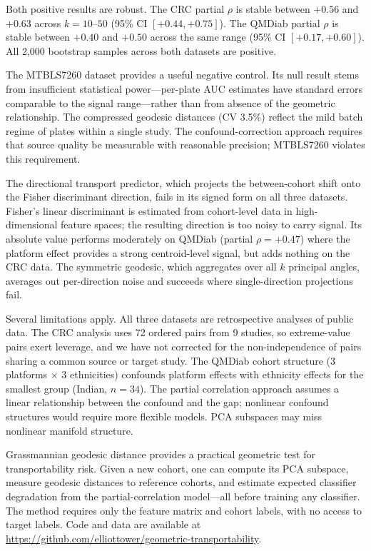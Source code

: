 \documentclass{article}
\begin{document}
Both positive results are robust. The CRC partial $\rho$ is stable between $+0.56$ and $+0.63$ across $k = 10$--$50$ (95\% CI $[+0.44, +0.75]$). The QMDiab partial $\rho$ is stable between $+0.40$ and $+0.50$ across the same range (95\% CI $[+0.17, +0.60]$). All 2{,}000 bootstrap samples across both datasets are positive.

The MTBLS7260 dataset provides a useful negative control. Its null result stems from insufficient statistical power---per-plate AUC estimates have standard errors comparable to the signal range---rather than from absence of the geometric relationship. The compressed geodesic distances (CV 3.5\%) reflect the mild batch regime of plates within a single study. The confound-correction approach requires that source quality be measurable with reasonable precision; MTBLS7260 violates this requirement.

The directional transport predictor, which projects the between-cohort shift onto the Fisher discriminant direction, fails in its signed form on all three datasets. Fisher's linear discriminant is estimated from cohort-level data in high-dimensional feature spaces; the resulting direction is too noisy to carry signal. Its absolute value performs moderately on QMDiab (partial $\rho = +0.47$) where the platform effect provides a strong centroid-level signal, but adds nothing on the CRC data. The symmetric geodesic, which aggregates over all $k$ principal angles, averages out per-direction noise and succeeds where single-direction projections fail.

Several limitations apply. All three datasets are retrospective analyses of public data. The CRC analysis uses 72 ordered pairs from 9 studies, so extreme-value pairs exert leverage, and we have not corrected for the non-independence of pairs sharing a common source or target study. The QMDiab cohort structure (3 platforms $\times$ 3 ethnicities) confounds platform effects with ethnicity effects for the smallest group (Indian, $n = 34$). The partial correlation approach assumes a linear relationship between the confound and the gap; nonlinear confound structures would require more flexible models. PCA subspaces may miss nonlinear manifold structure.

Grassmannian geodesic distance provides a practical geometric test for transportability risk. Given a new cohort, one can compute its PCA subspace, measure geodesic distances to reference cohorts, and estimate expected classifier degradation from the partial-correlation model---all before training any classifier. The method requires only the feature matrix and cohort labels, with no access to target labels. Code and data are available at \url{https://github.com/elliottower/geometric-transportability}.



\end{document}
